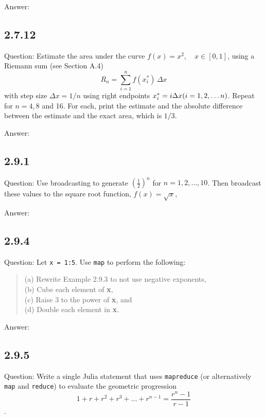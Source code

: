 \documentclass{article}
\begin{document}
Answer: 



\subsection{2.7.12}

Question: Estimate the area under the curve $f(x) = x^2, \quad x \in [0,1]$, using a Riemann sum (see Section A.4)
\[
R_n = \sum_{i=1}^n f(x_i^*) \, \Delta x
\]
with step size $\Delta x = 1/n$ using right endpoints $x_i^* = i\Delta x \space \space (i=1,2,\ldots n)$. Repeat for $n=4, 8$ and 16. For each, print the estimate and the absolute difference between the estimate and the exact area, which is $1/3$.


Answer:



\subsection{2.9.1}

Question: Use broadcasting to generate $(\frac{1}{2})^n$ for $n = 1, 2, \ldots, 10$. Then broadcast these values to the square root function, $f(x) = \sqrt{x}$,


Answer:


\subsection{2.9.4}

Question: Let \lstinline[columns=fixed]{x = 1:5}. Use \lstinline[columns=fixed]{map} to perform the following:
\begin{quote}
(a) Rewrite Example 2.9.3 to not use negative exponents, \\
(b) Cube each element of \textbf{x}, \\ 
(c) Raise 3 to the power of \textbf{x}, and \\
(d) Double each element in \textbf{x}.
\end{quote}

Answer: 


\subsection{2.9.5}

Question: Write a single Julia statement that uses \lstinline[columns=fixed]{mapreduce} (or alternatively \lstinline[columns=fixed]{map} and \lstinline[columns=fixed]{reduce}) to evaluate the geometric progression
\[
1+r+r^2+r^3+ \ldots + r^{n-1} = \frac{r^n - 1}{r-1}
\].
\end{document}
